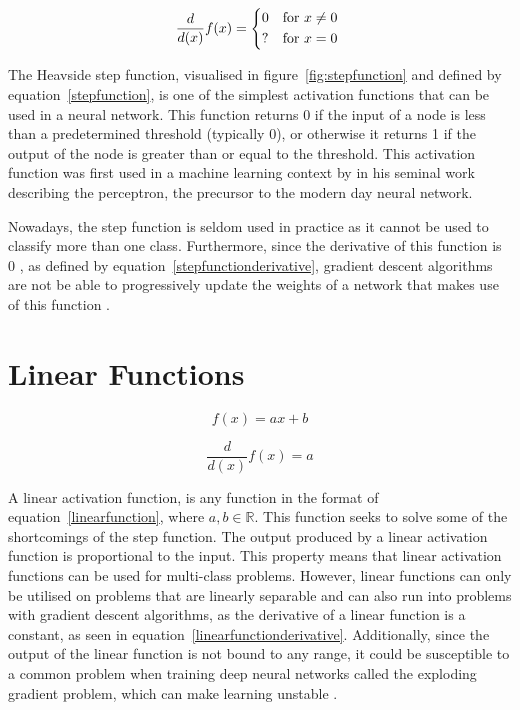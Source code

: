 \begin{equation}\label{stepfunctionderivative}
    \frac{d}{d(x)}f(x) =
      \begin{dcases*}
                                       0 & \text{for \(x \neq 0\)} \\
                                       ? & \text{for \(x = 0\)} \\
      \end{dcases*}
\end{equation}

The Heavside step function, visualised in figure~\ref{fig:stepfunction} and defined by equation~\ref{stepfunction}, is one of the simplest activation functions that can be used in a neural network. This function returns 0 if the input of a node is less than a predetermined threshold (typically 0), or otherwise it returns 1 if the output of the node is greater than or equal to the threshold. This activation function was first used in a machine learning context by \citet{rosenblatt1957perceptron} in his seminal work describing the perceptron, the precursor to the modern day neural network. 

Nowadays, the step function is seldom used in practice as it cannot be used to classify more than one class. Furthermore, since the derivative of this function is 0 , as defined by equation~\ref{stepfunctionderivative}, gradient descent algorithms are not be able to progressively update the weights of a network that makes use of this function \citep{Snyman2005}.

\section{Linear Functions}\label{sec:linear-function}

\begin{equation}\label{linearfunction}
    f(x) = ax + b
\end{equation}

\begin{equation}\label{linearfunctionderivative}
    \frac{d}{d(x)}f(x) = a
\end{equation}

A linear activation function, is any function in the format of equation~\ref{linearfunction}, where $a, b \in \mathbb{R}$. This function seeks to solve some of the shortcomings of the step function. The output produced by a linear activation function is proportional to the input. This property means that linear activation functions can be used for multi-class problems. However, linear functions can only be utilised on problems that are linearly separable and can also run into problems with gradient descent algorithms, as the derivative of a linear function is a constant, as seen in equation~\ref{linearfunctionderivative}. Additionally, since the output of the linear function is not bound to any range, it could be susceptible to a common problem when training deep neural networks called the exploding gradient problem, which can make learning unstable \citep{goodfellow2016deeplearning}.

